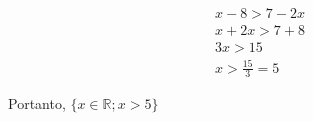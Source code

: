 \begin{eqnarray*}
		x-8>7-2x \\
		x+2x>7+8 \\
		3x>15 \\
		x>\frac{15}{3}=5 
\end{eqnarray*}

Portanto, $\{x\in \mathbb{R}; x> 5\}$
